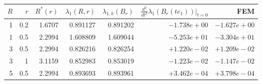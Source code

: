 \begin{tabular}{rrrrrrr}
\hline
$R$ & $r$ & $R^*(r)$ & $\lambda_1(R,r)$ & $\lambda_{1,h}(B_r)$ & $\frac{d^2}{dt^2}\lambda_1(B_r(te_1))|_{t=0}$ & FEM\\
\hline
1 & 0.2 & 1.6707 & 0.891127 & 0.891202 & $-1.738e+00$ & $-1.627e+00$\\
1 & 0.5 & 2.2994 & 1.608809 & 1.609044 & $-5.253e+01$ & $-3.304e+01$\\
3 & 0.5 & 2.2994 & 0.826216 & 0.826254 & $+1.220e-02$ & $+1.209e-02$\\
3 & 1 & 3.1159 & 0.852983 & 0.853019 & $-1.223e-02$ & $-1.147e-02$\\
5 & 0.5 & 2.2994 & 0.893693 & 0.893961 & $+3.462e-04$ & $+3.798e-04$\\
\hline
\end{tabular}
